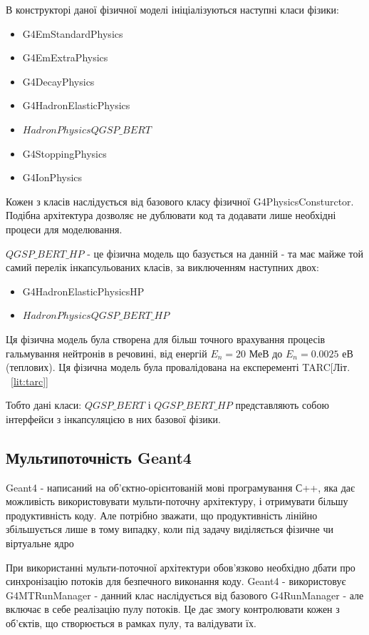 \documentclass[a4paper, 14pt]{article}
\numberwithin{equation}{section}
\numberwithin{table}{section}
\begin{document}
В конструкторі даної фізичної моделі ініціалізуються наступні класи фізики: 
\begin{itemize}
	\item G4EmStandardPhysics
	\item G4EmExtraPhysics
	\item G4DecayPhysics
	\item G4HadronElasticPhysics
	\item $HadronPhysicsQGSP\_BERT$
	\item G4StoppingPhysics
	\item G4IonPhysics
\end{itemize}
Кожен з класів наслідується від базового класу фізичної G4PhysicsConsturctor. Подібна архітектура дозволяє не дублювати код та додавати лише необхідні процеси для моделювання.

$QGSP\_BERT\_HP$ - це фізична модель що базується на данній - та має майже той самий перелік інкапсульованих класів, за виключенням наступних двох:
\begin{itemize}
	\item G4HadronElasticPhysicsHP
	\item $HadronPhysicsQGSP\_BERT\_HP$
\end{itemize}
Ця фізична модель була створена для більш точного врахування процесів гальмування нейтронів в речовині, від енергій $E_n = 20$ МеВ до $E_n = 0.0025$ еВ (теплових). Ця фізична модель була провалідована на експеременті TARC[Літ. ~\ref{lit:tarc}]

Тобто дані класи: $QGSP\_BERT$ і $QGSP\_BERT\_HP$ представляють собою інтерфейси з інкапсуляцією в них базової фізики.
	
\subsection{Мультипоточність Geant4}
Geant4 - написаний на об'єктно-орієнтованій мові програмування С++, яка дає можливість використовувати мульти-поточну архітектуру, і отримувати більшу продуктивність коду. Але потрібно зважати, що продуктивність лінійно збільшується лише в тому випадку, коли під задачу виділяється фізичне чи віртуальне ядро 
	
При використанні мульти-поточної архітектури обов'язково необхідно дбати про синхронізацію потоків для безпечного виконання коду. Geant4 - використовує G4MTRunManager - данний клас наслідується від базового G4RunManager - але включає в себе реалізацію пулу потоків. Це дає змогу контролювати кожен з об'єктів, що створюється в рамках пулу, та валідувати їх. 
\end{document}
